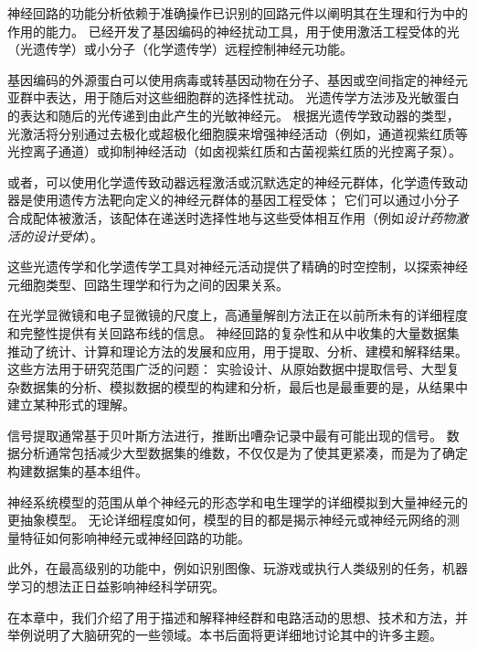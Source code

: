 \begin{proposition}[神经元活动的光遗传学和化学遗传学操作] \label{box:5_2}
	
	\quad \quad 神经回路的功能分析依赖于准确操作已识别的回路元件以阐明其在生理和行为中的作用的能力。
	已经开发了基因编码的神经扰动工具，用于使用激活工程受体的光（光遗传学）或小分子（化学遗传学）远程控制神经元功能。
	
	\quad \quad 基因编码的外源蛋白可以使用病毒或转基因动物在分子、基因或空间指定的神经元亚群中表达，用于随后对这些细胞群的选择性扰动。
	光遗传学方法涉及光敏蛋白的表达和随后的光传递到由此产生的光敏神经元。
	根据光遗传学致动器的类型，光激活将分别通过去极化或超极化细胞膜来增强神经活动（例如，通道视紫红质等光控离子通道）或抑制神经活动（如卤视紫红质和古菌视紫红质的光控离子泵）。
	
	\quad \quad 或者，可以使用化学遗传致动器远程激活或沉默选定的神经元群体，化学遗传致动器是使用遗传方法靶向定义的神经元群体的基因工程受体；
	它们可以通过小分子合成配体被激活，该配体在递送时选择性地与这些受体相互作用（例如\textit{设计药物激活的设计受体}）。
	
	\quad \quad 这些光遗传学和化学遗传学工具对神经元活动提供了精确的时空控制，以探索神经元细胞类型、回路生理学和行为之间的因果关系。
	
\end{proposition}



在光学显微镜和电子显微镜的尺度上，高通量解剖方法正在以前所未有的详细程度和完整性提供有关回路布线的信息。
神经回路的复杂性和从中收集的大量数据集推动了统计、计算和理论方法的发展和应用，用于提取、分析、建模和解释结果。
这些方法用于研究范围广泛的问题：
实验设计、从原始数据中提取信号、大型复杂数据集的分析、模拟数据的模型的构建和分析，最后也是最重要的是，从结果中建立某种形式的理解。


信号提取通常基于贝叶斯方法进行，推断出嘈杂记录中最有可能出现的信号。
数据分析通常包括减少大型数据集的维数，不仅仅是为了使其更紧凑，而是为了确定构建数据集的基本组件。


神经系统模型的范围从单个神经元的形态学和电生理学的详细模拟到大量神经元的更抽象模型。
无论详细程度如何，模型的目的都是揭示神经元或神经元网络的测量特征如何影响神经元或神经回路的功能。


此外，在最高级别的功能中，例如识别图像、玩游戏或执行人类级别的任务，机器学习的想法正日益影响神经科学研究。


在本章中，我们介绍了用于描述和解释神经群和电路活动的思想、技术和方法，并举例说明了大脑研究的一些领域。本书后面将更详细地讨论其中的许多主题。



